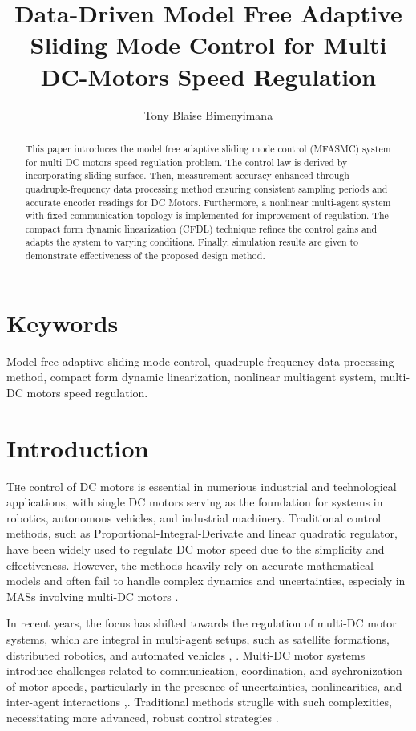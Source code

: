 \documentclass[journal,onecolumn]{IEEEtran}
\title{\LARGE Data-Driven Model Free Adaptive Sliding Mode Control for Multi DC-Motors Speed Regulation}
\author{Tony Blaise Bimenyimana}
\begin{document}
\maketitle


\begin{abstract}
    This paper introduces the model free adaptive sliding mode control (MFASMC) system for multi-DC motors speed regulation problem. The control law is derived by incorporating sliding surface. Then, measurement accuracy enhanced through quadruple-frequency data processing method ensuring consistent sampling periods and accurate encoder readings for DC Motors. Furthermore, a nonlinear multi-agent system with fixed communication topology is implemented for improvement of regulation. The compact form dynamic linearization (CFDL) technique refines the control gains and adapts the system to varying conditions. Finally, simulation results are given to demonstrate effectiveness of the proposed design method.
\end{abstract}

\section*{Keywords}
Model-free adaptive sliding mode control, quadruple-frequency data processing method, compact form dynamic linearization, nonlinear multiagent system, multi-DC motors speed regulation.




\section{Introduction}\label{section:1}

\lettrine{T}he control of DC motors is essential in numerious industrial and technological applications, with single DC motors serving as the foundation for systems in robotics, autonomous vehicles, and industrial machinery. Traditional control methods, such as Proportional-Integral-Derivate and linear quadratic regulator, have been widely used to regulate DC motor speed due to the simplicity and effectiveness. However, the methods heavily rely on accurate mathematical models and often fail to handle complex dynamics and uncertainties, especialy in MASs involving multi-DC motors \cite{1}.

In recent years, the focus has shifted towards the regulation of multi-DC motor systems, which are integral in multi-agent setups, such as satellite formations, distributed robotics, and automated vehicles \cite{2}, \cite{3}. Multi-DC motor systems introduce challenges related to communication, coordination, and sychronization of motor speeds, particularly in the presence of uncertainties, nonlinearities, and inter-agent interactions \cite{4},\cite{5}. Traditional methods struglle with such complexities, necessitating more advanced, robust control strategies \cite{7}.
\end{document}
